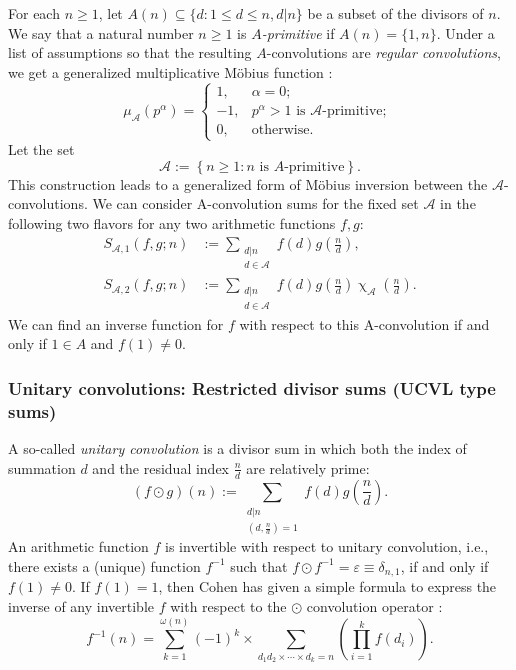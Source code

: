 \documentclass[12pt,reqno,a4letter]{article}
\numberwithin{figure}{section}
\numberwithin{table}{section}
\numberwithin{equation}{section}
\renewcommand{\chi}{\upchi}
\theoremstyle{plain}
\numberwithin{theorem}{section}
\theoremstyle{definition}
\begin{document}
For each $n \geq 1$, let $A(n) \subseteq \{d: 1 \leq d \leq n, d|n\}$ be a subset of the 
divisors of $n$. We say that a natural number $n \geq 1$ is \emph{$A$-primitive} if $A(n) = \{1, n\}$. 
Under a list of assumptions so that the resulting $A$-convolutions are \emph{regular convolutions}, 
we get a generalized multiplicative M\"obius function \cite{HANDBOOKNT-2004}: 
\[
\mu_{\mathcal{A}}(p^{\alpha}) = \begin{cases} 
     1, & \alpha = 0; \\ 
     -1, & p^{\alpha} > 1\text{\ is $\mathcal{A}$-primitive; } \\ 
     0, & \text{otherwise.}
     \end{cases} 
\]
Let the set 
\[
\mathcal{A} := \left\{n \geq 1: n \text{ is $A$-primitive}\right\}. 
\]
This construction leads to a generalized form of M\"obius inversion between the $\mathcal{A}$-convolutions. 
We can consider A-convolution sums for the fixed set $\mathcal{A}$ in the following two flavors for any two 
arithmetic functions $f,g$:
\begin{align*} 
S_{\mathcal{A},1}(f, g; n) & := \sum_{\substack{d|n \\ d \in \mathcal{A}}} f(d) g\left(\frac{n}{d}\right), \\ 
S_{\mathcal{A},2}(f, g; n) & := \sum_{\substack{d|n \\ d \in \mathcal{A}}} f(d) g\left(\frac{n}{d}\right) 
	\chi_{\mathcal{A}}\left(\frac{n}{d}\right). 
\end{align*} 
We can find an inverse function for $f$ 
with respect to this A-convolution if and only if $1 \in A$ and $f(1) \neq 0$. 

\subsubsection{Unitary convolutions: Restricted divisor sums (UCVL type sums)} 
\label{example_UnitaryCvlInversion} 

A so-called \emph{unitary convolution} is a divisor sum in which both the index of summation $d$ and the 
residual index $\frac{n}{d}$ are relatively prime:
\[
(f \odot g)(n) := \sum_{\substack{d|n \\ \left(d, \frac{n}{d}\right) = 1}} f(d) g\left(\frac{n}{d}\right). 
\]
An arithmetic function $f$ is invertible with respect to unitary convolution, i.e., there exists a (unique) 
function $f^{-1}$ such that $f \odot f^{-1} = \varepsilon \equiv \delta_{n,1}$, if and only if 
$f(1) \neq 0$. If $f(1) = 1$, then Cohen has given a simple formula to express the inverse of any invertible 
$f$ with respect to the $\odot$ convolution operator \cite{HANDBOOKNT-2004}: 
\[
f^{-1}(n) = \sum_{k=1}^{\omega(n)} (-1)^{k} \times \sum_{d_1 d_2 \times\cdots\times d_k = n} \left(
     \prod_{i=1}^k f(d_i)\right). 
\]
\end{document}
